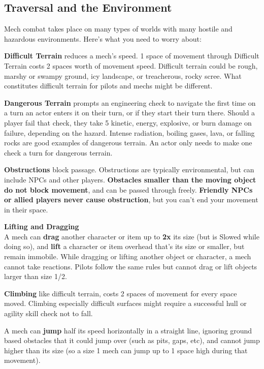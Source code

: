 \subsection{Traversal and the Environment}

Mech combat takes place on many types of worlds with many hostile and hazardous environments. Here’s what you need to worry about:


\textbf{Difficult Terrain} reduces a mech’s speed. 1 space of movement through Difficult Terrain costs 2 spaces worth of movement speed. Difficult terrain could be rough, marshy or swampy ground, icy landscape, or treacherous, rocky scree. What constitutes difficult terrain for pilots and mechs might be different.

\textbf{Dangerous Terrain} prompts an engineering check to navigate the first time on a turn an actor enters it on their turn, or if they start their turn there. Should a player fail that check, they take 5 kinetic, energy, explosive, or burn damage on failure, depending on the hazard. Intense radiation, boiling gases, lava, or falling rocks are good examples of dangerous terrain. An actor only needs to make one check a turn for dangerous terrain.

\textbf{Obstructions} block passage. Obstructions are typically environmental, but can include NPCs and other players. \textbf{Obstacles smaller than the moving object do not block movement}, and can be passed through freely. \textbf{Friendly NPCs or allied players never cause obstruction}, but you can’t end your movement in their space.


\textbf{Lifting and Dragging}\\
A mech can \textbf{drag} another character or item up to \textbf{2x} its size (but is Slowed while doing so), and \textbf{lift} a character or item overhead that’s its size or smaller, but remain immobile. While dragging or lifting another object or character, a mech cannot take reactions. Pilots follow the same rules but cannot drag or lift objects larger than size 1/2.

\textbf{Climbing} like difficult terrain, costs 2 spaces of movement for every space moved. Climbing especially difficult surfaces might require a successful hull or agility skill check not to fall.


A mech can \textbf{jump} half its speed horizontally in a straight line, ignoring ground based obstacles that it could jump over (such as pits, gaps, etc), and cannot jump higher than its size (so a size 1 mech can jump up to 1 space high during that movement).

